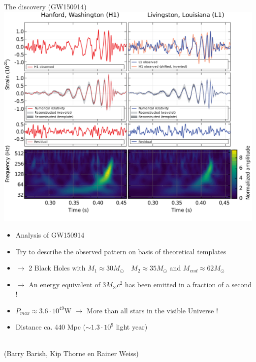 \newpage
%
\begin{center}
{\blue The discovery (GW150914)}\\[3mm]
\includegraphics[keepaspectratio,width=15cm]{GW150914}
\end{center}

\Tr
\onecolumn
\begin{itemize}
\item[] \begin{center}{\blue Analysis of GW150914}\end{center}
\item Try to describe the observed pattern on basis of theoretical templates
\item[] $\rightarrow$ 2 Black Holes with $M_{1} \approx 30M_{\odot} \quad M_{2} \approx 35M_{\odot}$ and $M_{end} \approx 62M_{\odot}$
\item[] $\rightarrow$ An energy equivalent of $3M_{\odot}c^{2}$ has been emitted in a fraction of a second !
\item[] $P_{max} \approx 3.6 \cdot 10^{49}$W $\rightarrow$ More than all stars in the visible Universe !
\item Distance ca. 440 Mpc ($\sim 1.3 \cdot 10^{9}$ light year)
\end{itemize}
%
\begin{center}
{\red {}}\\
(Barry Barish, Kip Thorne en Rainer Weiss)
\end{center}

